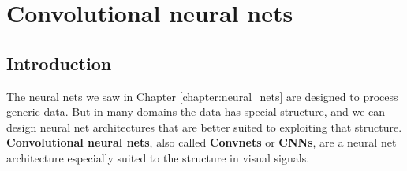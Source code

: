 \newcommand{\xin}{\mathbf{x}_{\texttt{in}}}
\newcommand{\xout}{\mathbf{x}_{\texttt{out}}}
\newcommand{\xini}{x_{\texttt{in}_i}}
\newcommand{\xouti}{x_{\texttt{out}_i}}
\newcommand{\xink}{x_{\texttt{in}_k}}
\newcommand{\xoutk}{x_{\texttt{out}_k}}
\newcommand{\xinpatch}{\tilde{x}_{\texttt{in}}}
\newcommand{\xoutpatch}{\tilde{x}_{\texttt{out}}}



\usetikzlibrary{arrows,arrows.spaced,decorations.markings,calc}
\pgfplotsset{colormap/viridis}

  

\chapter{Convolutional neural nets}
\label{chapter:convolutional_neural_nets}

\section{Introduction}

The neural nets we saw in Chapter \ref{chapter:neural_nets}
are designed to process generic data. But in many domains the data has special structure, and we can design neural net architectures that are better suited to exploiting that structure. {\bf Convolutional neural nets}, also called {\bf Convnets} or {\bf CNNs}, are a neural net architecture especially suited to the structure in visual signals.



